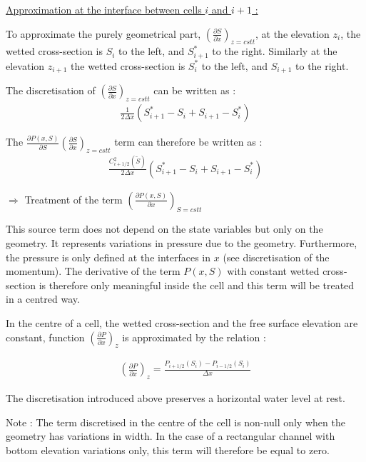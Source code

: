 \underline{Approximation at the interface between cells $i$ and $i+1$ :}

To approximate the purely geometrical part, $\left ( \frac{\partial S}{\partial x}\right )_{z=cstt}$, at the elevation $z_i$, the wetted cross-section is $S_i$ to the left, and $S^{*}_{i+1}$ to the right. Similarly at the elevation $z_{i+1}$ the wetted cross-section is $S^{*}_i$ to the left, and $S_{i+1}$ to the right.

The discretisation of $\left ( \frac{\partial S}{\partial x}\right )_{z=cstt}$ can be written as :
\begin{eqnarray}
 & \frac{1}{2 \Delta x} \left ( S_{i+1}^* -S_i +S_{i+1} - S_{i}^* \right ) & \nonumber
\end{eqnarray}

The $\frac{\partial P(x,S)}{\partial S}\left ( \frac{\partial S}{\partial x}\right )_{z=cstt}$ term can therefore be written as :
\begin{eqnarray}
 & \frac{C_{i+1/2}^2 (\tilde{S})}{2 \Delta x} \left ( S_{i+1}^* -S_i +S_{i+1} - S_{i}^* \right ) & \nonumber
\end{eqnarray}

$\Longrightarrow$ Treatment of the term $\left ( \frac{\partial P(x,S)}{\partial x} \right )_{S=cstt}$

This source term does not depend on the state variables but only on the geometry. It represents variations in pressure due to the geometry. Furthermore, the pressure is only defined at the interfaces in $x$ (see discretisation of the momentum). The derivative of the term $P(x,S)$ with constant wetted cross-section is therefore only meaningful inside the cell and this term will be treated in a centred way.

In the centre of a cell, the wetted cross-section and the free surface elevation are constant, function $\left ( \frac{\partial P}{\partial x} \right )_z$ is approximated by the relation :

\begin{eqnarray}
 & \left ( \frac{\partial P}{\partial x} \right )_z = \frac{P_{i+1/2}(S_i) - P_{i-1/2}(S_i)}{\Delta x} & \nonumber
\end{eqnarray}

The discretisation introduced above preserves a horizontal water level at rest.

\begin{CommentBlock}{Note :}
The term discretised in the centre of the cell is non-null only when the geometry has variations in width. In the case of a rectangular channel with bottom elevation variations only, this term will therefore be equal to zero.
\end{CommentBlock}

